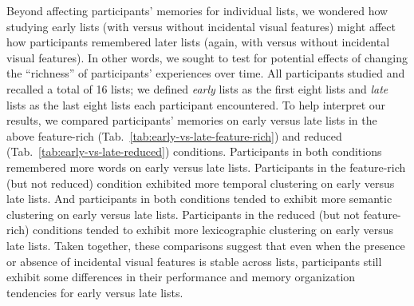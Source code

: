 \documentclass[11pt]{article}
\newcommand{\abbreviations}{S1}
\begin{document}
\begin{table}[tp]
\centering
\tiny


\caption{\textbf{Comparing memory for early versus late lists in the reduced
(early) condition.} The paired $t$-tests reported in the table were carried out
within-participant. Abbreviations used in this table are defined in
Table~\abbreviations.}

\label{tab:early-vs-late-early}
\end{table}

\begin{table}[tp]
\centering
\tiny


\caption{\textbf{Comparing memory for early versus late lists in the reduced
(late) condition.} The paired $t$-tests reported in the table were carried out
within-participant. Abbreviations used in this table are defined in
Table~\abbreviations.}

\label{tab:early-vs-late-late}
\end{table}

Beyond affecting participants' memories for individual lists, we wondered how
studying early lists (with versus without incidental visual features) might
affect how participants remembered later lists (again, with versus without
incidental visual features). In other words, we sought to test for potential
effects of changing the ``richness'' of participants' experiences over time.
All participants studied and recalled a total of 16 lists; we defined
\textit{early} lists as the first eight lists and \textit{late} lists as the
last eight lists each participant encountered. To help interpret our results,
we compared participants' memories on early versus late lists in the above
feature-rich (Tab.~\ref{tab:early-vs-late-feature-rich}) and reduced
(Tab.~\ref{tab:early-vs-late-reduced}) conditions. Participants in both
conditions remembered more words on early versus late lists. Participants in
the feature-rich (but not reduced) condition exhibited more temporal
clustering on early versus late lists. And participants in both conditions
tended to exhibit more semantic clustering on early versus late lists.
Participants in the reduced (but not feature-rich) conditions tended to exhibit
more lexicographic clustering on early versus late lists. Taken together, these
comparisons suggest that even when the presence or absence of incidental visual
features is stable across lists, participants still exhibit some differences in
their performance and memory organization tendencies for early versus late
lists.
\end{document}
